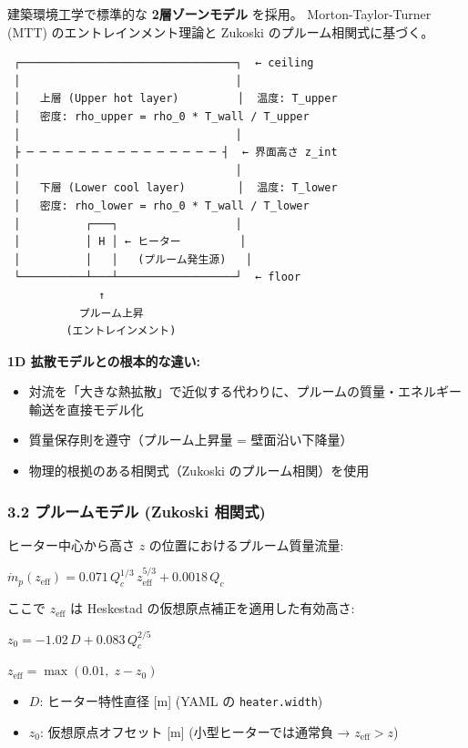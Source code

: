 \documentclass[a4paper,11pt]{article}
\begin{document}
建築環境工学で標準的な \textbf{2層ゾーンモデル} を採用。
Morton-Taylor-Turner (MTT) のエントレインメント理論と
Zukoski のプルーム相関式に基づく。

\begin{verbatim}
 ┌─────────────────────────────────┐  ← ceiling
 │                                 │
 │   上層 (Upper hot layer)         │  温度: T_upper
 │   密度: rho_upper = rho_0 * T_wall / T_upper
 │                                 │
 ├ ─ ─ ─ ─ ─ ─ ─ ─ ─ ─ ─ ─ ─ ─ ─ ┤  ← 界面高さ z_int
 │                                 │
 │   下層 (Lower cool layer)        │  温度: T_lower
 │   密度: rho_lower = rho_0 * T_wall / T_lower
 │          ┌───┐                  │
 │          │ H │ ← ヒーター         │
 │          │   │   (プルーム発生源)   │
 └──────────┴───┴──────────────────┘  ← floor
              ↑
           プルーム上昇
         (エントレインメント)
\end{verbatim}

\textbf{1D 拡散モデルとの根本的な違い:}

\begin{itemize} \item 対流を「大きな熱拡散」で近似する代わりに、プルームの質量・エネルギー輸送を直接モデル化 \end{itemize}
\begin{itemize} \item 質量保存則を遵守（プルーム上昇量 = 壁面沿い下降量） \end{itemize}
\begin{itemize} \item 物理的根拠のある相関式（Zukoski のプルーム相関）を使用 \end{itemize}

\subsubsection{3.2 プルームモデル (Zukoski 相関式)}

ヒーター中心から高さ $z$ の位置におけるプルーム質量流量:

$
\dot{m}_p(z_{\text{eff}}) = 0.071 \, Q_c^{1/3} \, z_{\text{eff}}^{5/3} + 0.0018 \, Q_c
$

ここで $z_{\text{eff}}$ は Heskestad の仮想原点補正を適用した有効高さ:

$
z_0 = -1.02 \, D + 0.083 \, Q_c^{2/5}
$

$
z_{\text{eff}} = \max(0.01, \; z - z_0)
$

\begin{itemize} \item $D$: ヒーター特性直径 [m] (YAML の \texttt{heater.width}) \end{itemize}
\begin{itemize} \item $z_0$: 仮想原点オフセット [m] (小型ヒーターでは通常負 → $z_{\text{eff}} > z$) \end{itemize}
\end{document}
